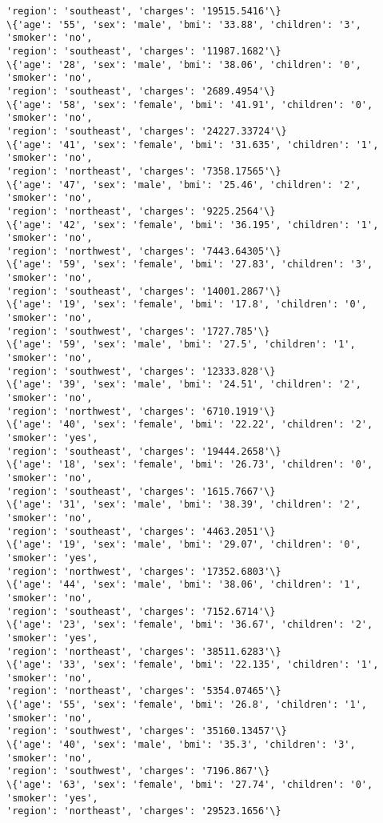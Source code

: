 \documentclass[11pt]{article}
\begin{document}
\begin{Verbatim}[commandchars=\\\{\}]
'region': 'southeast', 'charges': '19515.5416'\}
\{'age': '55', 'sex': 'male', 'bmi': '33.88', 'children': '3', 'smoker': 'no',
'region': 'southeast', 'charges': '11987.1682'\}
\{'age': '28', 'sex': 'male', 'bmi': '38.06', 'children': '0', 'smoker': 'no',
'region': 'southeast', 'charges': '2689.4954'\}
\{'age': '58', 'sex': 'female', 'bmi': '41.91', 'children': '0', 'smoker': 'no',
'region': 'southeast', 'charges': '24227.33724'\}
\{'age': '41', 'sex': 'female', 'bmi': '31.635', 'children': '1', 'smoker': 'no',
'region': 'northeast', 'charges': '7358.17565'\}
\{'age': '47', 'sex': 'male', 'bmi': '25.46', 'children': '2', 'smoker': 'no',
'region': 'northeast', 'charges': '9225.2564'\}
\{'age': '42', 'sex': 'female', 'bmi': '36.195', 'children': '1', 'smoker': 'no',
'region': 'northwest', 'charges': '7443.64305'\}
\{'age': '59', 'sex': 'female', 'bmi': '27.83', 'children': '3', 'smoker': 'no',
'region': 'southeast', 'charges': '14001.2867'\}
\{'age': '19', 'sex': 'female', 'bmi': '17.8', 'children': '0', 'smoker': 'no',
'region': 'southwest', 'charges': '1727.785'\}
\{'age': '59', 'sex': 'male', 'bmi': '27.5', 'children': '1', 'smoker': 'no',
'region': 'southwest', 'charges': '12333.828'\}
\{'age': '39', 'sex': 'male', 'bmi': '24.51', 'children': '2', 'smoker': 'no',
'region': 'northwest', 'charges': '6710.1919'\}
\{'age': '40', 'sex': 'female', 'bmi': '22.22', 'children': '2', 'smoker': 'yes',
'region': 'southeast', 'charges': '19444.2658'\}
\{'age': '18', 'sex': 'female', 'bmi': '26.73', 'children': '0', 'smoker': 'no',
'region': 'southeast', 'charges': '1615.7667'\}
\{'age': '31', 'sex': 'male', 'bmi': '38.39', 'children': '2', 'smoker': 'no',
'region': 'southeast', 'charges': '4463.2051'\}
\{'age': '19', 'sex': 'male', 'bmi': '29.07', 'children': '0', 'smoker': 'yes',
'region': 'northwest', 'charges': '17352.6803'\}
\{'age': '44', 'sex': 'male', 'bmi': '38.06', 'children': '1', 'smoker': 'no',
'region': 'southeast', 'charges': '7152.6714'\}
\{'age': '23', 'sex': 'female', 'bmi': '36.67', 'children': '2', 'smoker': 'yes',
'region': 'northeast', 'charges': '38511.6283'\}
\{'age': '33', 'sex': 'female', 'bmi': '22.135', 'children': '1', 'smoker': 'no',
'region': 'northeast', 'charges': '5354.07465'\}
\{'age': '55', 'sex': 'female', 'bmi': '26.8', 'children': '1', 'smoker': 'no',
'region': 'southwest', 'charges': '35160.13457'\}
\{'age': '40', 'sex': 'male', 'bmi': '35.3', 'children': '3', 'smoker': 'no',
'region': 'southwest', 'charges': '7196.867'\}
\{'age': '63', 'sex': 'female', 'bmi': '27.74', 'children': '0', 'smoker': 'yes',
'region': 'northeast', 'charges': '29523.1656'\}

\end{Verbatim}
\end{document}
